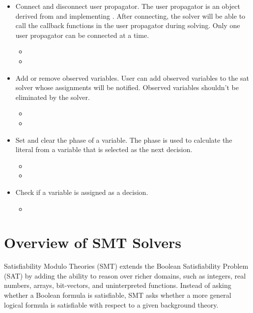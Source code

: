 \begin{itemize}
  \item Connect and disconnect user propagator. The user propagator is an object derived from and implementing . After connecting, the solver will be able to call the callback functions in the user propagator during solving. Only one user propagator can be connected at a time.
  \begin{itemize}
    \item {}
    \item {}
  \end{itemize}
  \item Add or remove observed variables. User can add observed variables to the sat solver whose assignments will be notified. Observed variables shouldn't be eliminated by the solver.
  \begin{itemize}
    \item {}
    \item {}
  \end{itemize}
  \item Set and clear the phase of a variable. The phase is used to calculate the literal from a variable that is selected as the next decision.
  \begin{itemize}
    \item {}
    \item {}
  \end{itemize}
  \item Check if a variable is assigned as a decision.
  \begin{itemize}
    \item {}
  \end{itemize}
\end{itemize}

\section{Overview of SMT Solvers}

Satisfiability Modulo Theories (SMT) extends the Boolean Satisfiability Problem (SAT) by adding the ability to reason over richer domains, such as integers, real numbers, arrays, bit-vectors, and uninterpreted functions. Instead of asking whether a Boolean formula is satisfiable, SMT asks whether a more general logical formula is satisfiable with respect to a given background theory.

